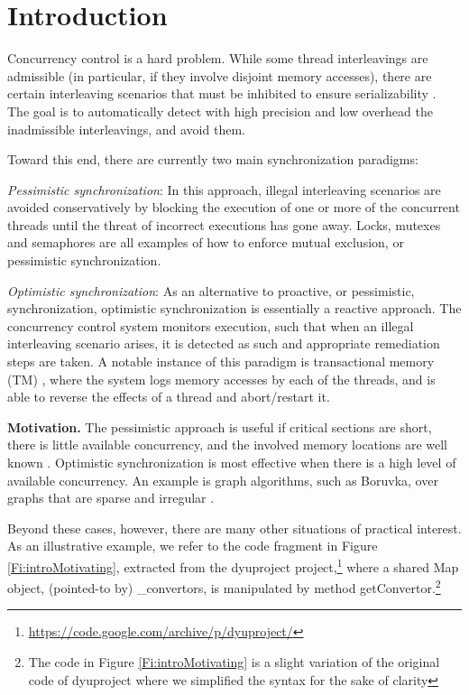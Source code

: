 \section{Introduction}\label{Se:intro}

Concurrency control is a hard problem. While some thread interleavings are admissible (in particular, if they involve disjoint memory accesses), there are certain interleaving scenarios that must be inhibited to ensure serializability \cite{Serializability}. The goal is to automatically detect with high precision and low overhead the inadmissible interleavings, and avoid them.  

Toward this end, there are currently two main synchronization paradigms:
\begin{compactitem}
	\item \textit{Pessimistic synchronization}: In this approach, illegal interleaving scenarios are avoided conservatively by blocking the execution of one or more of the concurrent threads until the threat of incorrect executions has gone away. Locks, mutexes and semaphores are all examples of how to enforce mutual exclusion, or pessimistic synchronization.
	\item \textit{Optimistic synchronization}: As an alternative to proactive, or pessimistic, synchronization, optimistic synchronization is essentially a reactive approach. The concurrency control system monitors execution, such that when an illegal interleaving scenario arises, it is detected as such and appropriate remediation steps are taken. A notable instance of this paradigm is transactional memory (TM) \cite{DBLP:conf/isca/HerlihyM93}, where the system logs memory accesses by each of the threads, and is able to reverse the effects of a thread and abort/restart it.
\end{compactitem}

\noindent \textbf{Motivation.} The pessimistic approach is useful if critical sections are short, there is little available concurrency, and the involved memory locations are well known \cite{AndiKleen}. Optimistic synchronization is most effective when there is a high level of available concurrency. An example is graph algorithms, such as Boruvka, over graphs that are sparse and irregular \cite{KulkarniGalois}.

Beyond these cases, however, there are many other situations of practical interest. As an illustrative example, we refer to the code fragment in Figure \ref{Fi:introMotivating}, extracted from the {\sf dyuproject} project,\footnote{\url{https://code.google.com/archive/p/dyuproject/}} where a shared {\sf Map} object, (pointed-to by) {\sf \_convertors}, is manipulated by method {\sf getConvertor}.\footnote{The code in Figure \ref{Fi:introMotivating} is a slight variation of the original code of {\sf dyuproject} where we simplified the syntax for the sake of clarity}

